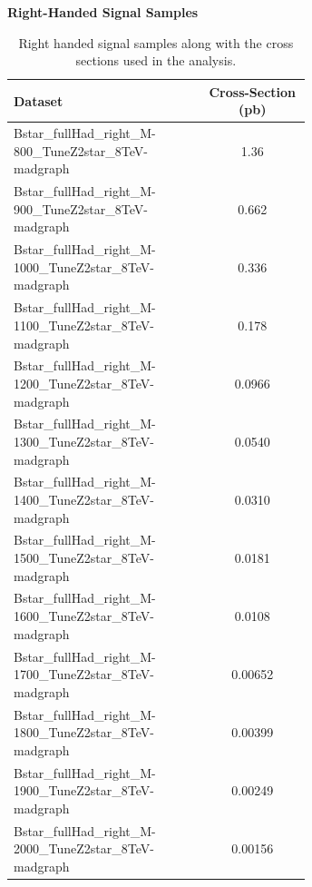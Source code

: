 \begin{table}
\begin{center}
\bf{Right-Handed Signal Samples}
\begin{tabular}{p{0.65\linewidth}|c}
\hline\hline
\bf{Dataset} &  \bf{Cross-Section (pb)} \\
\hline\hline
Bstar\_fullHad\_right\_M-800\_TuneZ2star\_8TeV-madgraph & 1.36 \\
Bstar\_fullHad\_right\_M-900\_TuneZ2star\_8TeV-madgraph & 0.662 \\
Bstar\_fullHad\_right\_M-1000\_TuneZ2star\_8TeV-madgraph & 0.336 \\ 
Bstar\_fullHad\_right\_M-1100\_TuneZ2star\_8TeV-madgraph & 0.178 \\ 
Bstar\_fullHad\_right\_M-1200\_TuneZ2star\_8TeV-madgraph & 0.0966 \\
Bstar\_fullHad\_right\_M-1300\_TuneZ2star\_8TeV-madgraph & 0.0540 \\
Bstar\_fullHad\_right\_M-1400\_TuneZ2star\_8TeV-madgraph & 0.0310 \\
Bstar\_fullHad\_right\_M-1500\_TuneZ2star\_8TeV-madgraph & 0.0181 \\
Bstar\_fullHad\_right\_M-1600\_TuneZ2star\_8TeV-madgraph & 0.0108 \\
Bstar\_fullHad\_right\_M-1700\_TuneZ2star\_8TeV-madgraph & 0.00652 \\
Bstar\_fullHad\_right\_M-1800\_TuneZ2star\_8TeV-madgraph & 0.00399 \\
Bstar\_fullHad\_right\_M-1900\_TuneZ2star\_8TeV-madgraph & 0.00249 \\
Bstar\_fullHad\_right\_M-2000\_TuneZ2star\_8TeV-madgraph & 0.00156 \\
\hline

\end{tabular}
\end{center}
\caption{Right handed signal samples along with the cross sections used in the analysis.}
\label{table:bssignalsetsright}
\end{table}

